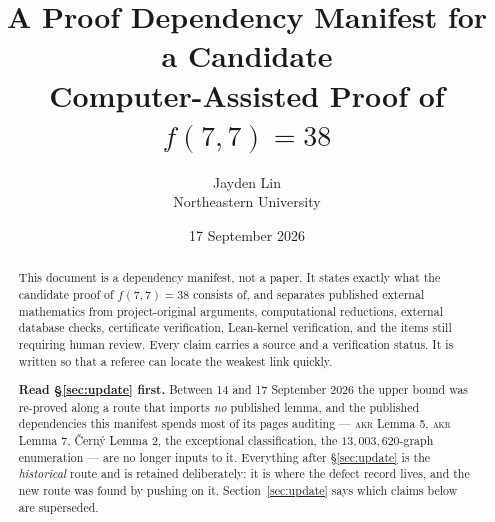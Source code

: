 \documentclass[11pt,a4paper]{article}
\title{A Proof Dependency Manifest for a Candidate\\
Computer-Assisted Proof of $f(7,7)=38$}
\author{Jayden Lin\\
\small Northeastern University}
\date{17 September 2026}
\theoremstyle{plain}
\theoremstyle{definition}
\theoremstyle{remark}
\begin{document}
\maketitle

\noindent{}
\par\medskip

\begin{abstract}
This document is a dependency manifest, not a paper. It states exactly what the
candidate proof of $f(7,7)=38$ consists of, and separates published external
mathematics from project-original arguments, computational reductions, external
database checks, certificate verification, Lean-kernel verification, and the
items still requiring human review. Every claim carries a source and a
verification status. It is written so that a referee can locate the weakest link
quickly.

\textbf{Read \S\ref{sec:update} first.} Between 14 and 17 September 2026 the
upper bound was re-proved along a route that imports \emph{no} published lemma,
and the published dependencies this manifest spends most of its pages auditing
--- \textsc{akr} Lemma 5, \textsc{akr} Lemma 7, {\v C}ern{\'y} Lemma 2, the
exceptional classification, the $13{,}003{,}620$-graph enumeration --- are no
longer inputs to it. Everything after \S\ref{sec:update} is the \emph{historical}
route and is retained deliberately: it is where the defect record lives, and the
new route was found by pushing on it. Section~\ref{sec:update} says which claims
below are superseded.
\end{abstract}
\end{document}
